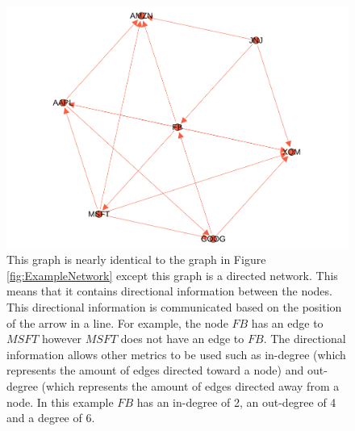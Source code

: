 \begin{figure}[!htb]
    \centering
     \includegraphics[width=\textwidth]{figures/Intro/ExampleNetworkDirected.pdf}
    \caption{
This graph is nearly identical to the graph in Figure \ref{fig:ExampleNetwork} except this graph is a directed network. This means that it contains directional information between the nodes. This directional information is communicated based on the position of the arrow in a line. For example, the node \(FB\) has an edge to \(MSFT\) however \(MSFT\) does not have an edge to \(FB\). The directional information allows other metrics to be used such as in-degree (which represents the amount of edges directed toward a node) and out-degree (which represents the amount of edges directed away from a node. In this example \(FB\) has an in-degree of 2, an out-degree of 4 and a degree of 6.
      }
	\label{fig:ExampleNetworkDirected}
\end{figure}



